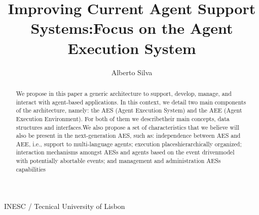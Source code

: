\documentclass{article}
\title{Improving Current Agent Support Systems:Focus on the Agent Execution System}
\author{Alberto Silva}
\date{}
\begin{document}
\maketitle
\vspace{-30}
\begin{center}
   INESC / Tecnical University of Lisbon 
\end{center}
\begin{abstract}
    We propose in this paper a generic architecture to support, develop, manage, and interact with agent-based applications. In this context, we detail two main components of the architecture, namely: the AES (Agent Execution System) and the AEE (Agent Execution Environment). For both of them we describetheir main concepts, data structures and interfaces.We also propose a set of characteristics that we believe will also be present in the next-generation AES, such as: independence between AES and AEE, i.e., support to multi-language agents; execution placeshierarchically organized; interaction mechanisms amongst AESs and agents based on the event drivenmodel with potentially abortable events; and management and administration AESs capabilities
\end{abstract}
\end{document}
